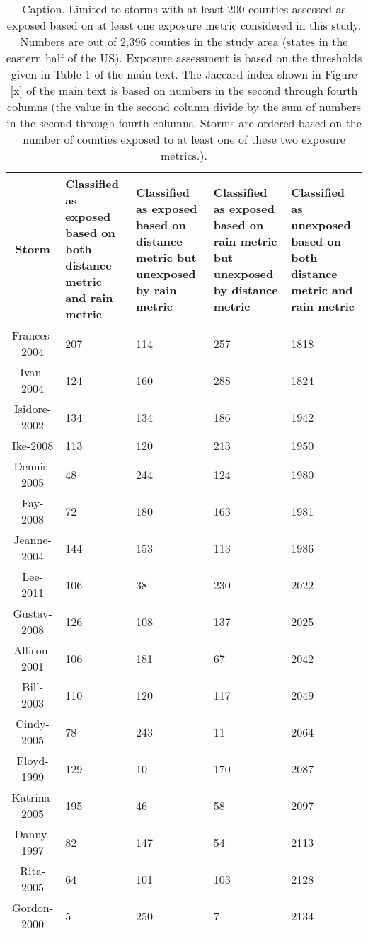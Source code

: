 \begin{table}[ht]
\centering
\caption{Caption. Limited to storms with at least 200 counties assessed as exposed based on at least one exposure metric considered in this study. Numbers are out of 2,396 counties in the study area (states in the eastern half of the US). Exposure assessment is based on the thresholds given in Table 1 of the main text. The Jaccard index shown in Figure [x] of the main text is based on numbers in the second through fourth columns (the value in the second column divide by the sum of numbers in the second through fourth columns.  Storms are ordered based on the number of counties exposed to at least one of these two exposure metrics.).} 
\begin{tabular}{cp{3cm}p{3cm}p{3cm}p{3cm}}
  \toprule
Storm & Classified as exposed based on both distance metric and rain metric & Classified as exposed based on distance metric but unexposed by rain metric & Classified as exposed based on rain metric but unexposed by distance metric & Classified as unexposed based on both distance metric and rain metric \\ 
  \midrule
Frances-2004 & 207 & 114 & 257 & 1818 \\ 
  Ivan-2004 & 124 & 160 & 288 & 1824 \\ 
  Isidore-2002 & 134 & 134 & 186 & 1942 \\ 
  Ike-2008 & 113 & 120 & 213 & 1950 \\ 
  Dennis-2005 &  48 & 244 & 124 & 1980 \\ 
  Fay-2008 &  72 & 180 & 163 & 1981 \\ 
  Jeanne-2004 & 144 & 153 & 113 & 1986 \\ 
  Lee-2011 & 106 &  38 & 230 & 2022 \\ 
  Gustav-2008 & 126 & 108 & 137 & 2025 \\ 
  Allison-2001 & 106 & 181 &  67 & 2042 \\ 
  Bill-2003 & 110 & 120 & 117 & 2049 \\ 
  Cindy-2005 &  78 & 243 &  11 & 2064 \\ 
  Floyd-1999 & 129 &  10 & 170 & 2087 \\ 
  Katrina-2005 & 195 &  46 &  58 & 2097 \\ 
  Danny-1997 &  82 & 147 &  54 & 2113 \\ 
  Rita-2005 &  64 & 101 & 103 & 2128 \\ 
  Gordon-2000 &   5 & 250 &   7 & 2134 \\ 

\end{tabular}
\end{table}
